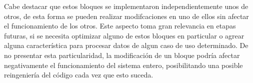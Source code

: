 Cabe destacar que estos bloques se implementaron independientemente unos de otros, de esta forma se pueden realizar modifcaciones en uno de ellos sin afectar el funcionamiento de los otros. Este aspecto toma gran relevancia en etapas futuras, si se necesita optimizar alguno de estos bloques en particular o agrear alguna característica para procesar datos de algun caso de uso determinado. De no presentar esta particularidad, la modificación de un bloque podría afectar negativamente el funcionamiento del sistema entero, posibilitando una posible reingeniería del código cada vez que esto suceda.

\begin{figure}[H]
        \centering
        \hspace{3 mm}


\end{figure}
